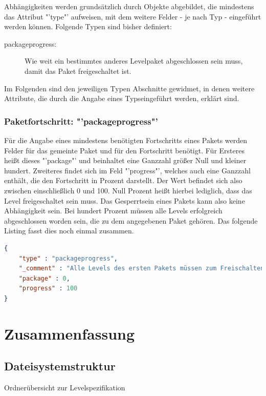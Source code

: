 Abhängigkeiten werden grundsätzlich durch Objekte abgebildet, die mindestens das Attribut "'type"' aufweisen, mit dem weitere Felder - je nach Typ - eingeführt werden können.
Folgende Typen sind bisher definiert:
\begin{description}
	\item[packageprogress:] Wie weit ein bestimmtes anderes Levelpaket abgeschlossen sein muss, damit das Paket freigeschaltet ist.
\end{description}
Im Folgenden sind den jeweiligen Typen Abschnitte gewidmet, in denen weitere Attribute, die durch die Angabe eines Typseingeführt werden, erklärt sind.

\subsubsection{Paketfortschritt: "'packageprogress"'}
Für die Angabe eines mindestens benötigten Fortschritts eines Pakets werden Felder für das gemeinte Paket und für den Fortschritt benötigt.
Für Ersteres heißt dieses "'package"' und beinhaltet eine Ganzzahl größer Null und kleiner hundert.
Zweiteres findet sich im Feld "'progress"', welches auch eine Ganzzahl enthält, die den Fortschritt in Prozent darstellt.
Der Wert befindet sich also zwischen einschließlich 0 und 100.
Null Prozent heißt hierbei lediglich, dass das Level freigeschaltet sein muss. 
Das Gesperrtsein eines Pakets kann also keine Abhängigkeit sein.
Bei hundert Prozent müssen alle Levels erfolgreich abgeschlossen worden sein, die zu dem angegebenen Paket gehören.
Das folgende Listing fasst dies noch einmal zusammen.
\begin{lstlisting}[language=json,caption={Besipielhafte Definition einer Abhängigkeit vom Typ "'boxprogress"'}]
{
	"type" : "packageprogress",
	"_comment" : "Alle Levels des ersten Pakets müssen zum Freischalten erfolgreich abgeschlossen worden sein",
	"package" : 0,
	"progress" : 100
}
\end{lstlisting}

\section{Zusammenfassung}
\subsection{Dateisystemstruktur}
Ordnerübersicht zur Levelspezifikation

